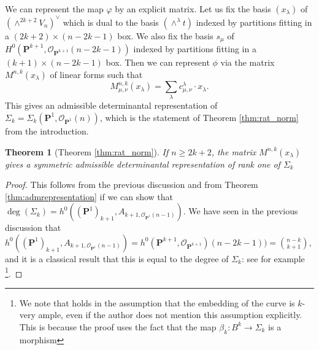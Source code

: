 \documentclass[12pt]{amsart}
\newcounter{thmcounter}
\numberwithin{equation}{section}
\numberwithin{thmcounter}{section}
\newtheorem{theorem}[thmcounter]{Theorem}
\theoremstyle{definition}
\theoremstyle{claim}
\newcommand{\nP}{\mathbf{P}}
\newcommand{\sO}{\mathscr{O}}
\begin{document}
	We can represent the map $\varphi$ by an explicit matrix. Let us fix the basis $(x_{\lambda})$ of $(\wedge^{2k+2}V_{n})^{\vee}$ which is dual to the basis $(\wedge^{\lambda}t)$ indexed by partitions fitting in a $(2k+2)\times (n-2k-1)$ box. We also fix the basis $s_{\mu}$ of $H^0(\nP^{k+1},\sO_{\nP^{k+1}}(n-2k-1))$ indexed by partitions fitting in a $(k+1)\times (n-2k-1)$ box. Then we can represent $\phi$ via the matrix $M^{n,k}(x_{\lambda})$ of linear forms such that
	\begin{equation}
		M^{n,k}_{\mu,\nu}(x_{\lambda}) = \sum_{\lambda} c^{\lambda}_{\mu,\nu}\cdot x_{\lambda}.
	\end{equation}
	This gives an admissible determinantal representation of $\Sigma_k=\Sigma_k(\nP^1,\sO_{\nP^1}(n))$, which is the statement of Theorem \ref{thm:rat_norm} from the introduction.
	
	\begin{theorem}[Theorem \ref{thm:rat_norm}]
		If $n\geq 2k+2$, the matrix $M^{n,k}(x_{\lambda})$ gives a symmetric admissible determinantal representation of rank one of $\Sigma_k$ 
	\end{theorem}
	
\begin{proof}This follows from the previous discussion and from Theorem \ref{thm:admrepresentation} if we can show that $\deg(\Sigma_k)=h^0((\nP^1)_{k+1},A_{k+1,\sO_{\nP^1}(n-1)})$. We have seen in the previous discussion that $h^0((\nP^1)_{k+1},A_{k+1,\sO_{\nP^1}(n-1)})=h^0(\nP^{k+1},\sO_{\nP^{k+1}})(n-2k-1)) = \binom{n-k}{k+1}$, and it is a classical result that this is equal to the degree of $\Sigma_k$: see for example \cite[Proposition 1]{soule}\footnote{We note that \cite[Proposition 1]{soule} holds in the assumption that the embedding of the curve is $k$-very ample, even if the author does not mention this assumption explicitly. This is because the proof uses the fact that the map $\beta_k\colon B^k\to \Sigma_k$ is a morphism}.
\end{proof}
\end{document}
